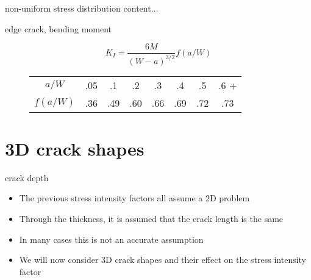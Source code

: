 \documentclass[10pt]{beamer}
\begin{document}
\begin{frame}{non-uniform stress distribution}
	content...
\end{frame}

\begin{frame}{edge crack, bending moment}
	\begin{figure}[H]
		\begin{equation}
		K_I = \frac{6M}{(W-a)^{3/2}} f(a/W)
		\end{equation}
		\begin{tabular}{c|ccccccc}
			$a/W$& .05 & .1 & .2 & .3 & .4 & .5 & .6 + \\ 
			$f(a/W)$& .36 & .49 & .60 & .66 & .69 & .72 & .73
		\end{tabular}
		 
		\vspace{1cm}
		
		\centering
	\end{figure}
\end{frame}

\section{3D crack shapes}

\begin{frame}{crack depth}
	\begin{itemize}
		\item The previous stress intensity factors all assume a 2D problem
		\item Through the thickness, it is assumed that the crack length is the same
		\item In many cases this is not an accurate assumption
		\item We will now consider 3D crack shapes and their effect on the stress intensity factor
	\end{itemize}
\end{frame}
\end{document}
